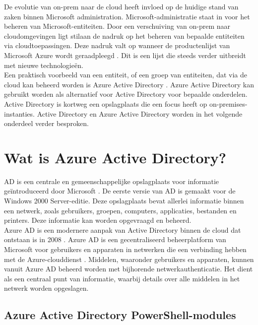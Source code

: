 
De evolutie van \ac{on-prem} naar de cloud heeft invloed op de huidige stand van zaken binnen Microsoft administration. Microsoft-administratie staat in voor het beheren van Microsoft-entiteiten. Door een verschuiving van \ac{on-prem} naar cloudomgevingen ligt stilaan de nadruk op het beheren van bepaalde entiteiten via cloudtoepassingen. Deze nadruk valt op wanneer de productenlijst van Microsoft Azure wordt geraadpleegd \autocite{Microsoft2023b}. Dit is een lijst die steeds verder  uitbreidt met nieuwe technologieën. \\

Een praktisch voorbeeld van een entiteit, of een groep van entiteiten, dat via de cloud kan beheerd worden is Azure Active Directory \autocite{Microsoft2023c}. Azure Active Directory kan gebruikt worden als alternatief voor Active Directory voor bepaalde onderdelen. Active Directory is kortweg een opslagplaats die een focus heeft op on-premises-instanties. Active Directory en Azure Active Directory worden in het volgende onderdeel verder besproken.


\section{Wat is Azure Active Directory?}


\ac{AD} is een centrale en gemeenschappelijke opslagplaats voor informatie geïntroduceerd door Microsoft \autocite{Allen2003}. De eerste versie van \ac{AD} is gemaakt voor de Windows 2000 Server-editie. Deze opslagplaats bevat allerlei informatie binnen een netwerk, zoals gebruikers, groepen, computers, applicaties, bestanden en printers. Deze informatie kan worden opgevraagd en beheerd. \\

Azure \ac{AD} is een modernere aanpak van Active Directory binnen de cloud dat ontstaan is in 2008 \autocite{Chappell2008}. Azure \ac{AD} is een gecentraliseerd beheerplatform van Microsoft voor gebruikers en apparaten in netwerken die een verbinding hebben met de Azure-clouddienst \autocite{Mayank2019}. Middelen, waaronder gebruikers en apparaten, kunnen vanuit Azure \ac{AD} beheerd worden met bijhorende netwerkauthenticatie. Het dient als een centraal punt van informatie, waarbij details over alle middelen in het netwerk worden opgeslagen.

\subsection{Azure Active Directory PowerShell-modules} 

